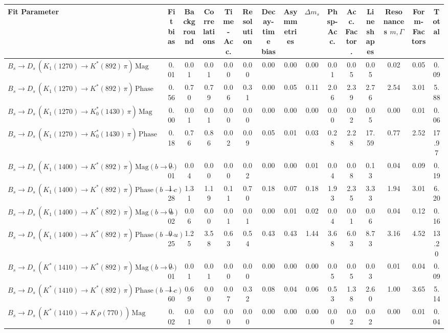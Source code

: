 \begin{tabular}{l  c  c  c  c  c  c  c  c  c  c  c  c  c  | c }
\hline
\hline
Fit Parameter & Fit bias & Background & Correlations & Time-Acc. & Resolution & Decay-time bias & Asymmetries & $\Delta m_{s}$ & Phsp-Acc. & Acc. Factor. & Lineshapes & Resonances $m,\Gamma$ & Form-Factors &  Total  \\ 
\hline
$B_s \to D_s \, ( K_1(1270) \to K^{*}(892) \, \pi ) \, \text{Mag}$ & 0.01 & 0.01 & 0.01 & 0.00 & 0.00 & 0.00 & 0.00 & 0.00 & 0.01 & 0.05 & 0.05 & 0.02 & 0.05 & 0.09 \\ 
$B_s \to D_s \, ( K_1(1270) \to K^{*}(892) \, \pi ) \, \text{Phase}$ & 0.56 & 0.70 & 0.79 & 0.06 & 0.31 & 0.00 & 0.05 & 0.11 & 2.06 & 2.39 & 2.76 & 2.54 & 3.01 & 5.88 \\ 
$B_s \to D_s \, ( K_1(1270) \to K^{*}_{0}(1430) \, \pi ) \, \text{Mag} $ & 0.00 & 0.01 & 0.01 & 0.00 & 0.00 & 0.00 & 0.00 & 0.00 & 0.00 & 0.02 & 0.05 & 0.00 & 0.01 & 0.06 \\ 
$B_s \to D_s \, ( K_1(1270) \to K^{*}_{0}(1430) \, \pi ) \, \text{Phase} $ & 0.18 & 0.76 & 0.86 & 0.02 & 0.09 & 0.05 & 0.01 & 0.03 & 0.28 & 2.28 & 17.59 & 0.77 & 2.52 & 17.97 \\ 
$B_s \to D_s \, ( K_1(1400) \to K^{*}(892) \, \pi ) \, \text{Mag} (b \to c)$ & 0.01 & 0.04 & 0.00 & 0.00 & 0.02 & 0.00 & 0.00 & 0.01 & 0.04 & 0.08 & 0.13 & 0.04 & 0.09 & 0.19 \\ 
$B_s \to D_s \, ( K_1(1400) \to K^{*}(892) \, \pi ) \, \text{Phase} (b \to c)$ & 1.28 & 1.31 & 1.19 & 0.11 & 0.70 & 0.18 & 0.07 & 0.18 & 1.93 & 2.35 & 3.33 & 1.94 & 3.01 & 6.20 \\ 
$B_s \to D_s \, ( K_1(1400) \to K^{*}(892) \, \pi ) \, \text{Mag} (b \to u)$ & 0.02 & 0.06 & 0.00 & 0.01 & 0.01 & 0.00 & 0.01 & 0.02 & 0.04 & 0.01 & 0.06 & 0.04 & 0.12 & 0.16 \\ 
$B_s \to D_s \, ( K_1(1400) \to K^{*}(892) \, \pi ) \, \text{Phase} (b \to u)$ & 0.25 & 1.25 & 3.58 & 0.63 & 0.54 & 0.43 & 0.43 & 1.44 & 3.68 & 6.03 & 8.73 & 3.16 & 4.52 & 13.20 \\ 
$B_s \to D_s \, ( K^{*}(1410) \to K^{*}(892) \, \pi ) \, \text{Mag} (b \to c)$ & 0.01 & 0.01 & 0.01 & 0.00 & 0.00 & 0.00 & 0.00 & 0.00 & 0.05 & 0.05 & 0.03 & 0.01 & 0.04 & 0.09 \\ 
$B_s \to D_s \, ( K^{*}(1410) \to K^{*}(892) \, \pi ) \, \text{Phase} (b \to c)$ & 1.60 & 0.69 & 0.00 & 0.07 & 0.32 & 0.08 & 0.04 & 0.06 & 0.53 & 1.38 & 2.60 & 1.00 & 3.65 & 5.14 \\ 
$B_s \to D_s \, ( K^{*}(1410) \to K \, \rho(770) ) \, \text{Mag}$ & 0.02 & 0.01 & 0.00 & 0.00 & 0.00 & 0.00 & 0.00 & 0.00 & 0.00 & 0.02 & 0.02 & 0.00 & 0.01 & 0.04 \\ 

\end{tabular}
